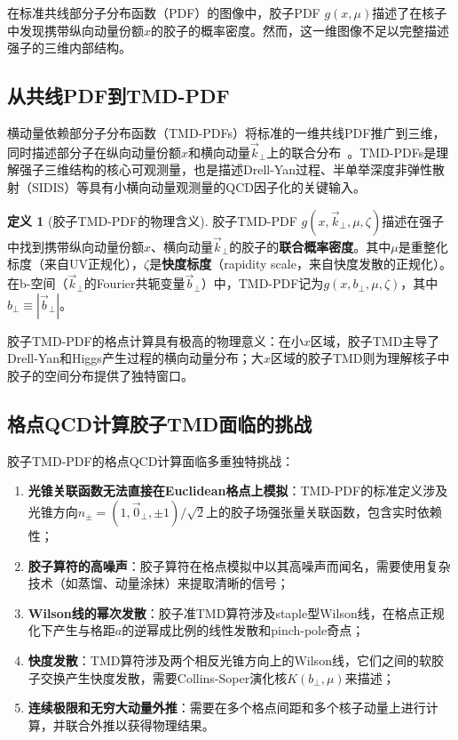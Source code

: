 \documentclass[12pt,a4paper]{ctexart}
\theoremstyle{definition}
\newtheorem{definition}{定义}[section]
\begin{document}
在标准共线部分子分布函数（PDF）的图像中，胶子PDF $g(x,\mu)$描述了在核子中发现携带纵向动量份额$x$的胶子的概率密度。然而，这一维图像不足以完整描述强子的三维内部结构。

\subsection{从共线PDF到TMD-PDF}

横动量依赖部分子分布函数（TMD-PDFs）将标准的一维共线PDF推广到三维，同时描述部分子在纵向动量份额$x$和横向动量$\vec{k}_\perp$上的联合分布~\cite{Collins2011foundations}。TMD-PDFs是理解强子三维结构的核心可观测量，也是描述Drell-Yan过程、半单举深度非弹性散射（SIDIS）等具有小横向动量观测量的QCD因子化的关键输入。

\begin{definition}[胶子TMD-PDF的物理含义]
胶子TMD-PDF $g(x, \vec{k}_\perp, \mu, \zeta)$描述在强子中找到携带纵向动量份额$x$、横向动量$\vec{k}_\perp$的胶子的\textbf{联合概率密度}。其中$\mu$是重整化标度（来自UV正规化），$\zeta$是\textbf{快度标度}（rapidity scale，来自快度发散的正规化）。在b-空间（$\vec{k}_\perp$的Fourier共轭变量$\vec{b}_\perp$）中，TMD-PDF记为$g(x, b_\perp, \mu, \zeta)$，其中$b_\perp \equiv |\vec{b}_\perp|$。
\end{definition}

胶子TMD-PDF的格点计算具有极高的物理意义：在小$x$区域，胶子TMD主导了Drell-Yan和Higgs产生过程的横向动量分布；大$x$区域的胶子TMD则为理解核子中胶子的空间分布提供了独特窗口。

\subsection{格点QCD计算胶子TMD面临的挑战}

胶子TMD-PDF的格点QCD计算面临多重独特挑战：

\begin{enumerate}[leftmargin=*]
    \item \textbf{光锥关联函数无法直接在Euclidean格点上模拟}：TMD-PDF的标准定义涉及光锥方向$n_\pm = (1, \vec{0}_\perp, \pm 1)/\sqrt{2}$上的胶子场强张量关联函数，包含实时依赖性；
    \item \textbf{胶子算符的高噪声}：胶子算符在格点模拟中以其高噪声而闻名，需要使用复杂技术（如蒸馏、动量涂抹）来提取清晰的信号；
    \item \textbf{Wilson线的幂次发散}：胶子准TMD算符涉及staple型Wilson线，在格点正规化下产生与格距$a$的逆幂成比例的线性发散和pinch-pole奇点；
    \item \textbf{快度发散}：TMD算符涉及两个相反光锥方向上的Wilson线，它们之间的软胶子交换产生快度发散，需要Collins-Soper演化核$K(b_\perp,\mu)$来描述；
    \item \textbf{连续极限和无穷大动量外推}：需要在多个格点间距和多个核子动量上进行计算，并联合外推以获得物理结果。
\end{enumerate}
\end{document}
